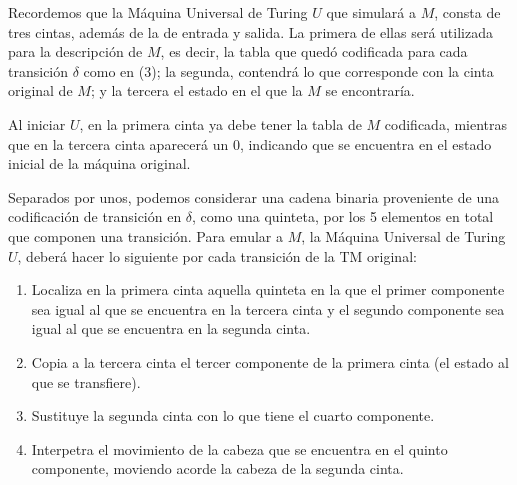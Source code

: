 \documentclass[12pt]{article}
\begin{document}
Recordemos que la Máquina Universal de Turing $U$ que simulará a $M$, consta de tres cintas, además de la de entrada y salida. La primera de ellas
será utilizada para la descripción de $M$, es decir, la tabla que quedó codificada para cada transición $\delta$ como en (3); la segunda, contendrá lo que corresponde con la cinta original de $M$; y la tercera el estado en el que la $M$ se encontraría.

Al iniciar $U$, en la primera cinta ya debe tener la tabla de $M$ codificada, mientras que en la tercera cinta aparecerá un 0, indicando que se encuentra en el estado inicial de la máquina original.

Separados por unos, podemos considerar una cadena binaria proveniente de una codificación de transición en $\delta$, como una quinteta, por los 5 elementos en total que componen una transición. Para emular a $M$, la Máquina Universal de Turing $U$, deberá hacer lo siguiente por cada
transición de la TM original:\\
\begin{enumerate}
\item Localiza en la primera cinta aquella quinteta en la que el primer componente sea igual al que se encuentra en la tercera cinta y el segundo
  componente sea igual al que se encuentra en la segunda cinta.
\item Copia a la tercera cinta el tercer componente de la primera cinta (el estado al que se transfiere).
\item Sustituye la segunda cinta con lo que tiene el cuarto componente.
\item Interpetra el movimiento de la cabeza que se encuentra en el quinto componente, moviendo acorde la cabeza de la segunda cinta. 
\end{enumerate}
\end{document}
